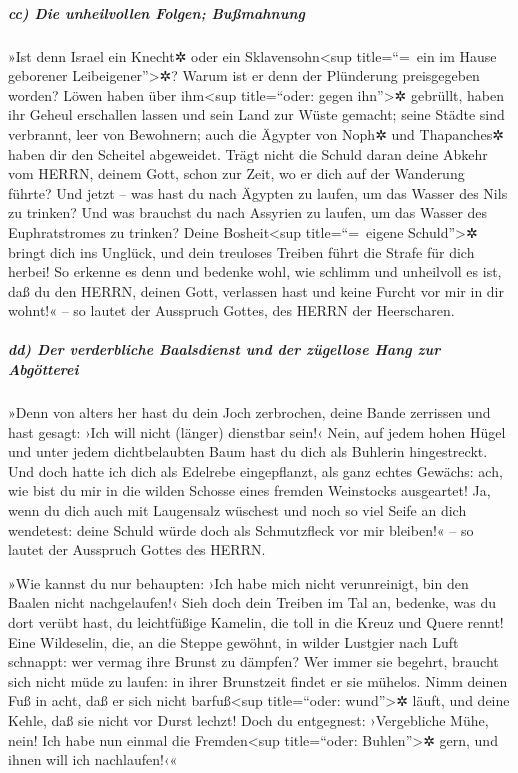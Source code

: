 \hypertarget{cc-die-unheilvollen-folgen-buuxdfmahnung}{%
\subparagraph{cc) Die unheilvollen Folgen;
Bußmahnung}\label{cc-die-unheilvollen-folgen-buuxdfmahnung}}

»Ist denn Israel ein Knecht✲ oder ein
Sklavensohn\textless sup title=``=~ein im Hause geborener
Leibeigener''\textgreater✲? Warum ist er denn der Plünderung
preisgegeben worden? Löwen haben über ihm\textless sup
title=``oder: gegen ihn''\textgreater✲ gebrüllt, haben ihr Geheul
erschallen lassen und sein Land zur Wüste gemacht; seine Städte sind
verbrannt, leer von Bewohnern; auch die Ägypter von Noph✲
und Thapanches✲ haben dir den Scheitel abgeweidet. Trägt
nicht die Schuld daran deine Abkehr vom HERRN, deinem Gott, schon zur
Zeit, wo er dich auf der Wanderung führte? Und jetzt --
was hast du nach Ägypten zu laufen, um das Wasser des Nils zu trinken?
Und was brauchst du nach Assyrien zu laufen, um das Wasser des
Euphratstromes zu trinken? Deine Bosheit\textless sup
title=``=~eigene Schuld''\textgreater✲ bringt dich ins Unglück, und dein
treuloses Treiben führt die Strafe für dich herbei! So erkenne es denn
und bedenke wohl, wie schlimm und unheilvoll es ist, daß du den HERRN,
deinen Gott, verlassen hast und keine Furcht vor mir in dir wohnt!« --
so lautet der Ausspruch Gottes, des HERRN der Heerscharen.

\hypertarget{dd-der-verderbliche-baalsdienst-und-der-zuxfcgellose-hang-zur-abguxf6tterei}{%
\subparagraph{dd) Der verderbliche Baalsdienst und der zügellose Hang
zur
Abgötterei}\label{dd-der-verderbliche-baalsdienst-und-der-zuxfcgellose-hang-zur-abguxf6tterei}}

»Denn von alters her hast du dein Joch zerbrochen, deine
Bande zerrissen und hast gesagt: ›Ich will nicht (länger) dienstbar
sein!‹ Nein, auf jedem hohen Hügel und unter jedem dichtbelaubten Baum
hast du dich als Buhlerin hingestreckt. Und doch hatte
ich dich als Edelrebe eingepflanzt, als ganz echtes Gewächs: ach, wie
bist du mir in die wilden Schosse eines fremden Weinstocks ausgeartet!
Ja, wenn du dich auch mit Laugensalz wüschest und noch so
viel Seife an dich wendetest: deine Schuld würde doch als Schmutzfleck
vor mir bleiben!« -- so lautet der Ausspruch Gottes des HERRN.

»Wie kannst du nur behaupten: ›Ich habe mich nicht
verunreinigt, bin den Baalen nicht nachgelaufen!‹ Sieh doch dein Treiben
im Tal an, bedenke, was du dort verübt hast, du leichtfüßige Kamelin,
die toll in die Kreuz und Quere rennt! Eine Wildeselin,
die, an die Steppe gewöhnt, in wilder Lustgier nach Luft schnappt: wer
vermag ihre Brunst zu dämpfen? Wer immer sie begehrt, braucht sich nicht
müde zu laufen: in ihrer Brunstzeit findet er sie mühelos.
Nimm deinen Fuß in acht, daß er sich nicht
barfuß\textless sup title=``oder: wund''\textgreater✲ läuft, und deine
Kehle, daß sie nicht vor Durst lechzt! Doch du entgegnest: ›Vergebliche
Mühe, nein! Ich habe nun einmal die Fremden\textless sup title=``oder:
Buhlen''\textgreater✲ gern, und ihnen will ich nachlaufen!‹«

